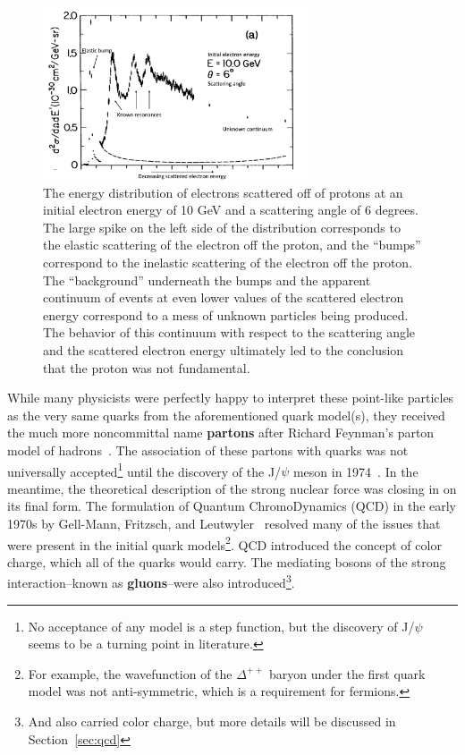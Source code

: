 \begin{figure}[ht]
    \centering
    \includegraphics[width=0.7\textwidth]{figures/introduction/DeepInelasticScattering.png}
    \caption{The energy distribution of electrons scattered off of protons at an initial electron energy of 10 GeV and a scattering angle of 6 degrees. The large spike on the left side of the distribution corresponds to the elastic scattering of the electron off the proton, and the ``bumps'' correspond to the inelastic scattering of the electron off the proton. The ``background'' underneath the bumps and the apparent continuum of events at even lower values of the scattered electron energy correspond to a mess of unknown particles being produced. The behavior of this continuum with respect to the scattering angle and the scattered electron energy ultimately led to the conclusion that the proton was not fundamental.}
    \label{fig:dis}
\end{figure}

While many physicists were perfectly happy to interpret these point-like particles as the very same quarks from the aforementioned quark model(s), they received the much more noncommittal name \textbf{partons} after Richard Feynman's parton model of hadrons~\cite{Partons}. The association of these partons with quarks was not universally accepted\footnote{No acceptance of any model is a step function, but the discovery of J/$\psi$ seems to be a turning point in literature.} until the discovery of the J/$\psi$ meson in 1974~\cite{Jpsi}. In the meantime, the theoretical description of the strong nuclear force was closing in on its final form. The formulation of Quantum ChromoDynamics (QCD) in the early 1970s by Gell-Mann, Fritzsch, and Leutwyler~\cite{QCDFormulation} resolved many of the issues that were present in the initial quark models\footnote{For example, the wavefunction of the $\Delta^{++}$ baryon under the first quark model was not anti-symmetric, which is a requirement for fermions.}. QCD introduced the concept of color charge, which all of the quarks would carry. The mediating bosons of the strong interaction--known as \textbf{gluons}--were also introduced\footnote{And also carried color charge, but more details will be discussed in Section~\ref{sec:qcd}}. 

